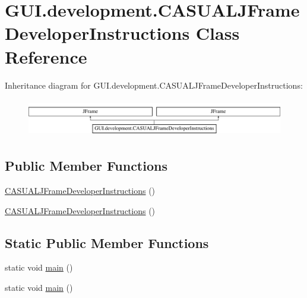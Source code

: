 \hypertarget{classGUI_1_1development_1_1CASUALJFrameDeveloperInstructions}{\section{G\-U\-I.\-development.\-C\-A\-S\-U\-A\-L\-J\-Frame\-Developer\-Instructions Class Reference}
\label{classGUI_1_1development_1_1CASUALJFrameDeveloperInstructions}
}
Inheritance diagram for G\-U\-I.\-development.\-C\-A\-S\-U\-A\-L\-J\-Frame\-Developer\-Instructions\-:\begin{figure}[H]
\begin{center}
\leavevmode
\includegraphics[height=1.671642cm]{classGUI_1_1development_1_1CASUALJFrameDeveloperInstructions}
\end{center}
\end{figure}
\subsection*{Public Member Functions}
\begin{DoxyCompactItemize}
\item 
\hyperlink{classGUI_1_1development_1_1CASUALJFrameDeveloperInstructions_a032e50fd2b2444c584e5dc9dd4ac1495}{C\-A\-S\-U\-A\-L\-J\-Frame\-Developer\-Instructions} ()
\item 
\hyperlink{classGUI_1_1development_1_1CASUALJFrameDeveloperInstructions_a032e50fd2b2444c584e5dc9dd4ac1495}{C\-A\-S\-U\-A\-L\-J\-Frame\-Developer\-Instructions} ()
\end{DoxyCompactItemize}
\subsection*{Static Public Member Functions}
\begin{DoxyCompactItemize}
\item 
static void \hyperlink{classGUI_1_1development_1_1CASUALJFrameDeveloperInstructions_aa7060624c791d6584f86c3319140ba6f}{main} ()
\item 
static void \hyperlink{classGUI_1_1development_1_1CASUALJFrameDeveloperInstructions_aa7060624c791d6584f86c3319140ba6f}{main} ()
\end{DoxyCompactItemize}


